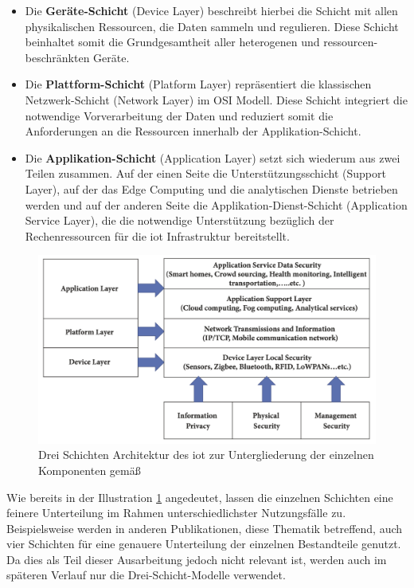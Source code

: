 \begin{itemize}
    \item Die \textbf{Geräte-Schicht} (Device Layer) beschreibt hierbei die Schicht mit allen physikalischen Ressourcen, die Daten sammeln und regulieren. Diese Schicht beinhaltet somit die Grundgesamtheit aller heterogenen und ressourcen-beschränkten Geräte.
    \item Die \textbf{Plattform-Schicht} (Platform Layer) repräsentiert die klassischen \\Netzwerk-Schicht (Network Layer) im OSI Modell. Diese Schicht integriert die notwendige Vorverarbeitung der Daten und reduziert somit die Anforderungen an die Ressourcen innerhalb der Applikation-Schicht.
    \item Die \textbf{Applikation-Schicht} (Application Layer) setzt sich wiederum aus zwei Teilen zusammen. Auf der einen Seite die Unterstützungsschicht (Support Layer), auf der das Edge Computing und die analytischen Dienste betrieben werden und auf der anderen Seite die Applikation-Dienst-Schicht (Application Service Layer), die die notwendige Unterstützung bezüglich der Rechenressourcen für die \ac{iot} Infrastruktur bereitstellt.
\end{itemize}

\begin{figure}
    \includegraphics[width=\textwidth]{fundamentals/pictures/IoT_Layer_Architecture}
    \caption{Drei Schichten Architektur des \ac{iot} zur Untergliederung der einzelnen Komponenten gemäß \cite{Seliem2018}}
    \label{fig:drei-schichten-iot}
\end{figure}

\noindent Wie bereits in der Illustration \ref{fig:drei-schichten-iot} angedeutet, lassen die einzelnen Schichten eine feinere Unterteilung im Rahmen unterschiedlichster Nutzungsfälle zu. Beispielsweise werden in anderen Publikationen, diese Thematik betreffend, auch vier Schichten für eine genauere Unterteilung der einzelnen Bestandteile genutzt. Da dies als Teil dieser Ausarbeitung jedoch nicht relevant ist, werden auch im späteren Verlauf nur die Drei-Schicht-Modelle verwendet.

